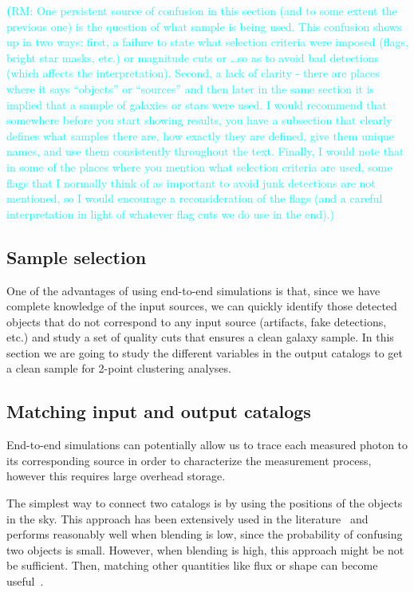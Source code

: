 \documentclass[twocolumn]{aastex62}
\newcommand{\rachel}[1]{{\textcolor{cyan}{{\textbf (RM: #1)}}}}
\begin{document}
\rachel{One persistent source of confusion in this section (and to some extent the previous one) is the question of what sample is being used.  This confusion shows up in two ways: first, a failure to state what selection criteria were imposed (flags, bright star masks, etc.) or magnitude cuts or \dots so as to avoid bad detections (which affects the interpretation).  Second, a lack of clarity - there are places where it says ``objects'' or ``sources'' and then later in the same section it is implied that a sample of galaxies or stars were used.  I would recommend that somewhere before you start showing results, you have a subsection that clearly defines what samples there are, how exactly they are defined, give them unique names, and use them consistently throughout the text.  Finally, I would note that in some of the places where you mention what selection criteria are used, some flags that I normally think of as important to avoid junk detections are not mentioned, so I would encourage a reconsideration of the flags (and a careful interpretation in light of whatever flag cuts we do use in the end).}

\subsection{Sample selection}
\label{sec:sample_selection}

One of the advantages of using end-to-end simulations is that, since we have complete knowledge of the input sources, we can quickly identify those detected objects that do not correspond to any input source (artifacts, fake detections, etc.) and study a set of quality cuts that ensures a clean galaxy sample. In this section we are going to study the different variables in the output catalogs to get a clean sample for 2-point clustering analyses.

\subsection{Matching input and output catalogs}
\label{sec:matching}

End-to-end simulations can potentially allow us to trace each measured photon to its corresponding source in order to characterize the measurement process, however this requires large overhead storage. 

The simplest way to connect two catalogs is by using the positions of the objects in the sky. This approach has been extensively used in the literature~\citep{1977A&AS...28..211D,1983Obs...103..150B,1986MNRAS.223..279W} and performs reasonably well when blending is low, since the probability of confusing two objects is small. However, when blending is high, this approach might be not be sufficient. Then, matching other quantities like flux or shape can become useful~\citep{2008ApJ...679..301B}.
\end{document}
